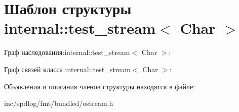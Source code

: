 \hypertarget{structinternal_1_1test__stream}{}\section{Шаблон структуры internal\+:\+:test\+\_\+stream$<$ Char $>$}
\label{structinternal_1_1test__stream}


Граф наследования\+:internal\+:\+:test\+\_\+stream$<$ Char $>$\+:


Граф связей класса internal\+:\+:test\+\_\+stream$<$ Char $>$\+:


Объявления и описания членов структуры находятся в файле\+:\begin{DoxyCompactItemize}
\item 
inc/spdlog/fmt/bundled/ostream.\+h\end{DoxyCompactItemize}
